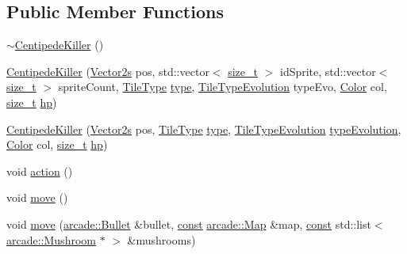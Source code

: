 \subsection*{Public Member Functions}
\begin{DoxyCompactItemize}
\item 
\hyperlink{classarcade_1_1_centipede_killer_a2f994586c1a35bfbed329cfdbb3de940}{$\sim$\-Centipede\-Killer} ()
\item 
\hyperlink{classarcade_1_1_centipede_killer_ae0d974f8840ba720a1b105f58b3990e5}{Centipede\-Killer} (\hyperlink{namespacearcade_a8e527f7400fbff9c38dc31e0a3dd06a1}{Vector2s} pos, std\-::vector$<$ \hyperlink{nc__alloc_8h_a7b60c5629e55e8ec87a4547dd4abced4}{size\-\_\-t} $>$ id\-Sprite, std\-::vector$<$ \hyperlink{nc__alloc_8h_a7b60c5629e55e8ec87a4547dd4abced4}{size\-\_\-t} $>$ sprite\-Count, \hyperlink{namespacearcade_a61ba576694ea309cdf2b4b66902408ca}{Tile\-Type} \hyperlink{classarcade_1_1_entity_ae7c84a1d8dfb2e2581a745f3743409c5}{type}, \hyperlink{namespacearcade_a2e0a64a64203f78c9efb84a1475a8cf4}{Tile\-Type\-Evolution} type\-Evo, \hyperlink{unionarcade_1_1_color}{Color} col, \hyperlink{nc__alloc_8h_a7b60c5629e55e8ec87a4547dd4abced4}{size\-\_\-t} \hyperlink{classarcade_1_1_a_living_entity_a47a3ed7e55199abbf84e2b80eb9df233}{hp})
\item 
\hyperlink{classarcade_1_1_centipede_killer_a0815f759baed7fb5009e6f58c7100ca7}{Centipede\-Killer} (\hyperlink{namespacearcade_a8e527f7400fbff9c38dc31e0a3dd06a1}{Vector2s} pos, \hyperlink{namespacearcade_a61ba576694ea309cdf2b4b66902408ca}{Tile\-Type} \hyperlink{classarcade_1_1_entity_ae7c84a1d8dfb2e2581a745f3743409c5}{type}, \hyperlink{namespacearcade_a2e0a64a64203f78c9efb84a1475a8cf4}{Tile\-Type\-Evolution} \hyperlink{classarcade_1_1_entity_a01a2fd9e95413166c79f680995a9cf3a}{type\-Evolution}, \hyperlink{unionarcade_1_1_color}{Color} col, \hyperlink{nc__alloc_8h_a7b60c5629e55e8ec87a4547dd4abced4}{size\-\_\-t} \hyperlink{classarcade_1_1_a_living_entity_a47a3ed7e55199abbf84e2b80eb9df233}{hp})
\item 
void \hyperlink{classarcade_1_1_centipede_killer_a20731fd4c7998cc7110b03e2ba1b18ef}{action} ()
\item 
void \hyperlink{classarcade_1_1_centipede_killer_a0535da7ea61e90ee69d38db7570ea11a}{move} ()
\item 
void \hyperlink{classarcade_1_1_centipede_killer_aafd52361896a54727a6a0cb9df9ddbdf}{move} (\hyperlink{classarcade_1_1_bullet}{arcade\-::\-Bullet} \&bullet, \hyperlink{term__entry_8h_a57bd63ce7f9a353488880e3de6692d5a}{const} \hyperlink{classarcade_1_1_map}{arcade\-::\-Map} \&map, \hyperlink{term__entry_8h_a57bd63ce7f9a353488880e3de6692d5a}{const} std\-::list$<$ \hyperlink{classarcade_1_1_mushroom}{arcade\-::\-Mushroom} $\ast$ $>$ \&mushrooms)

\end{DoxyCompactItemize}

